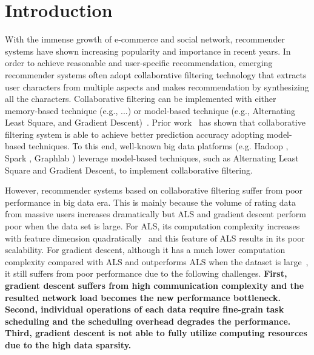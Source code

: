 \documentclass{llncs}
\begin{document}
\vspace{-30pt}
\section{Introduction}
\vspace{-5pt}

With the immense growth of e-commerce and social network, recommender systems have shown increasing popularity and importance in recent years.
In order to achieve reasonable and user-specific recommendation, emerging recommender systems often adopt collaborative filtering technology that  extracts user characters from multiple aspects and makes recommendation by synthesizing all the characters. Collaborative filtering  can be implemented with either memory-based technique (e.g., ...) or model-based technique (e.g., Alternating Least Square, and Gradient Descent)~\cite{MemoryBasedCF}. Prior work~\cite{MF2009,recSurvey2013} has shown that collaborative filtering system is able to achieve better prediction accuracy adopting model-based techniques. To this end, well-known big data platforms (e.g. Hadoop \cite{Hadoop}, Spark \cite{SparkMllib}, Graphlab \cite{graphlab}) leverage model-based techniques, such as Alternating Least Square and Gradient Descent, to implement collaborative filtering.

However, recommender systems based on collaborative filtering suffer from poor performance in big data era. This is mainly because the volume of rating data from massive users increases dramatically but ALS and gradient descent perform poor when the data set is large. 
For ALS, its computation complexity increases with feature dimension quadratically~\cite{ibm2011} and this feature of ALS results in its poor scalability. For gradient descent, although it has a much lower computation complexity compared with ALS and outperforms ALS when the dataset is large~\cite{sgdKdd2015,sgdFast2015,ibm2011}, it still suffers from poor performance due to the following challenges. 
\textbf{First, gradient descent suffers from high communication complexity and the resulted network load becomes the new performance bottleneck. Second, individual operations of each data require fine-grain task scheduling and the scheduling overhead degrades the performance. Third, gradient descent is not able to fully utilize computing resources due to the high data sparsity.}
\end{document}
